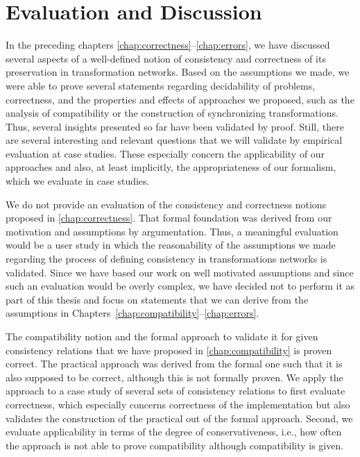 \chapter{Evaluation and Discussion 
}
\label{chap:correctness_evaluation}

In the preceding chapters \ref{chap:correctness}--\ref{chap:errors}, we have discussed several aspects of a well-defined notion of consistency and correctness of its preservation in transformation networks.
Based on the assumptions we made, we were able to prove several statements regarding decidability of problems, correctness, and the properties and effects of approaches we proposed, such as the analysis of compatibility or the construction of synchronizing transformations.
Thus, several insights presented so far have been validated by proof.
Still, there are several interesting and relevant questions that we will validate by empirical evaluation at case studies.
These especially concern the applicability of our approaches and also, at least implicitly, the appropriateness of our formalism, which we evaluate in case studies.

We do not provide an evaluation of the consistency and correctness notions proposed in \autoref{chap:correctness}.
That formal foundation was derived from our motivation and assumptions by argumentation.
Thus, a meaningful evaluation would be a user study in which the reasonability of the assumptions we made regarding the process of defining consistency in transformations networks is validated.
Since we have based our work on well motivated assumptions and since such an evaluation would be overly complex, we have decided not to perform it as part of this thesis and focus on statements that we can derive from the assumptions in Chapters~\ref{chap:compatibility}--\ref{chap:errors}.

The compatibility notion and the formal approach to validate it for given consistency relations that we have proposed in \autoref{chap:compatibility} is proven correct.
The practical approach was derived from the formal one such that it is also supposed to be correct, although this is not formally proven.
We apply the approach to a case study of several sets of consistency relations to first evaluate correctness, which especially concerns correctness of the implementation but also validates the construction of the practical out of the formal approach.
Second, we evaluate applicability in terms of the degree of conservativeness, i.e., how often the approach is not able to prove compatibility although compatibility is given.

